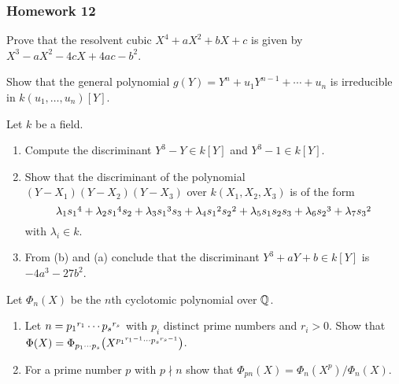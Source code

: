 \subsubsection{Homework 12}
\setcounter{exercise}{0}
\setcounter{equation}{0}

\begin{problem}
  Prove that the resolvent cubic \(X^4+aX^2+bX+c\) is given by
  \(X^3-aX^2-4cX+4ac-b^2\).
\end{problem}
\begin{solution}
\end{solution}

\begin{problem}
  Show that the general polynomial \(g(Y)=Y^n+u_1Y^{n-1}+\dotsb+u_n\) is
  irreducible in \(k(u_1,\dotsc,u_n)[Y]\).
\end{problem}
\begin{solution}
\end{solution}

\begin{problem}
  Let \(k\) be a field.
  \begin{enumerate}[label=(\alph*)]
  \item Compute the discriminant \(Y^3-Y\in k[Y]\) and \(Y^3-1\in k[Y]\).
  \item Show that the discriminant of the polynomial
    \((Y-X_1)(Y-X_2)(Y-X_3)\) over \(k(X_1,X_2,X_3)\) is of the form
    \[
      \lambda_1\cramped{{s_1}^4}+ \lambda_2\cramped{{s_1}^4}s_2+
      \lambda_3\cramped{{s_1}^3}s_3+
      \lambda_4\cramped{{s_1}^2}\cramped{{s_2}^2}+
      \lambda_5s_1s_2s_3+\lambda_6\cramped{{s_2}^3}+
      \lambda_7\cramped{{s_3}^2}
    \]
    with \(\lambda_i\in k\).
  \item From (b) and (a) conclude that the discriminant
    \(Y^3+aY+b\in k[Y]\) is \(-4a^3-27b^2\).
\end{enumerate}
\end{problem}
\begin{solution}
\end{solution}

\begin{problem}
  Let \(\Phi_n(X)\) be the \(n\)th cyclotomic polynomial over \(\mathbb{Q}\).
  \begin{enumerate}[label=(\alph*)]
  \item Let \(n=\cramped{{p_1}^{r_1}\dotsm{p_s}^{r_s}}\) with \(p_i\)
    distinct prime numbers and \(r_i>0\). Show that
    \(\Phi(X)=\Phi_{p_1\dotsm p_s}\bigl(X^{\cramped{{p_1}^{r_1-1}
        \dotsm{p_s}^{r_s-1}}}\bigr)\).
    \item For a prime number \(p\) with \(p\nmid n\) show that
      \(\Phi_{pn}(X)=\Phi_n(X^p)/\Phi_n(X)\).
  \end{enumerate}
\end{problem}
\begin{solution}
\end{solution}

